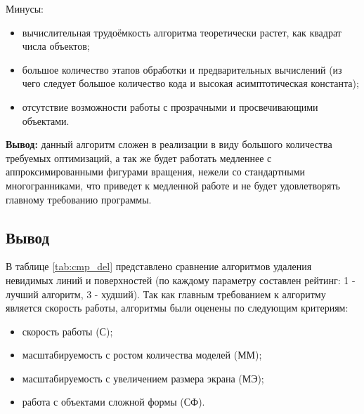 Минусы:
\begin{itemize}
    \item вычислительная трудоёмкость алгоритма теоретически растет, как квадрат числа объектов;
    \item большое количество этапов обработки и предварительных вычислений (из чего следует большое количество кода и высокая асимптотическая константа);
    \item отсутствие возможности работы с прозрачными и просвечивающими объектами.
\end{itemize}

\textbf{Вывод:} данный алгоритм сложен в реализации в виду большого количества требуемых оптимизаций, а так же будет работать медленнее с аппроксимированными фигурами вращения, нежели со стандартными многогранниками, что приведет к медленной работе и не будет удовлетворять главному требованию программы.

\subsection*{Вывод}

В таблице \ref{tab:cmp_del} представлено сравнение алгоритмов удаления невидимых линий и поверхностей (по каждому параметру составлен рейтинг: 1 - лучший алгоритм, 3 - худший). Так как главным требованием к алгоритму является скорость работы, алгоритмы были оценены по следующим критериям:
\begin{itemize}
    \item скорость работы (С);
    \item масштабируемость с ростом количества моделей (ММ);
    \item масштабируемость с увеличением размера экрана (МЭ);
    \item работа с объектами сложной формы (СФ).
\end{itemize}

